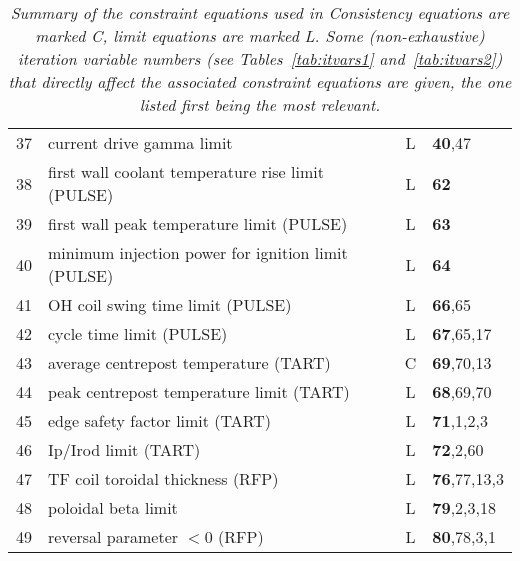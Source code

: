 \begin{table}[tbph]
\begin{center}
\begin{tabular}{||c|l|c|l||}
37  & current drive gamma limit                           & L    & {\bf 40},47 \\
38  & first wall coolant temperature rise limit (PULSE)   & L    & {\bf 62} \\
39  & first wall peak temperature limit (PULSE)           & L    & {\bf 63} \\
40  & minimum injection power for ignition limit (PULSE)  & L    & {\bf 64} \\
41  & OH coil swing time limit (PULSE)                    & L    & {\bf 66},65 \\
42  & cycle time limit (PULSE)                            & L    & {\bf 67},65,17 \\
43  & average centrepost temperature (TART)               & C    & {\bf 69},70,13 \\
44  & peak centrepost temperature limit (TART)            & L    & {\bf 68},69,70 \\
45  & edge safety factor limit    (TART)                  & L    & {\bf 71},1,2,3 \\
46  & Ip/Irod limit               (TART)                  & L    & {\bf 72},2,60 \\
47  & TF coil toroidal thickness  (RFP)                   & L    & {\bf 76},77,13,3 \\
48  & poloidal beta limit                                 & L    & {\bf 79},2,3,18 \\
49  & reversal parameter $< 0$ (RFP)                      & L    & {\bf 80},78,3,1 \\ \hline
\end{tabular}
\end{center}
\caption[TABLE_EQNS]{{\it
Summary of the constraint equations used in \PSD Consistency equations are
marked C, limit equations are marked L\@. Some (non-exhaustive) iteration
variable numbers (see Tables~\ref{tab:itvars1} and~\ref{tab:itvars2}) that
directly affect the associated constraint equations are given, the one listed
first being the most relevant.  }}
\label{tab:eqns}
\end{table}
\normalsize
